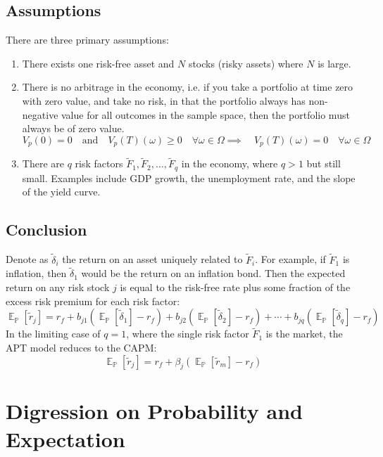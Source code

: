 \documentclass[11pt]{article}
\theoremstyle{definition}
\theoremstyle{remark}
\DeclareMathOperator{\Exp}{\mathbb{E}}
\DeclareMathOperator{\Prob}{\mathbb{P}}
\begin{document}
\subsection{Assumptions}
There are three primary assumptions:
\begin{enumerate}
\item There exists one risk-free asset and $N$ stocks (risky assets) where $N$ is large.
\item There is no arbitrage in the economy, i.e. if you take a portfolio at time zero with zero value, and take no risk, in that the portfolio always has non-negative value for all outcomes in the sample space, then the portfolio must always be of zero value.
$$V_p(0) = 0 \quad \text{and} \quad V_p(T)(\omega) \geq 0 \quad \forall \omega \in \Omega \implies \quad V_p(T)(\omega) = 0 \quad \forall \omega \in \Omega$$
\item There are $q$ risk factors $\tilde{F}_1, \tilde{F}_2, \dots, \tilde{F}_q$ in the economy, where $q > 1$ but still small. Examples include GDP growth, the unemployment rate, and the slope of the yield curve.
\end{enumerate}

\subsection{Conclusion}

Denote as $\tilde{\delta}_i$ the return on an asset uniquely related to $\tilde{F}_i$. For example, if $\tilde{F}_1$ is inflation, then $\tilde{\delta}_1$ would be the return on an inflation bond. Then the expected return on any risk stock $j$ is equal to the risk-free rate plus some fraction of the excess risk premium for each risk factor:
$$\Exp_{\Prob}\left[\tilde{r}_j\right] = r_f + b_{j1} \left( \Exp_{\Prob}\left[\tilde{\delta}_1\right] - r_f \right) + b_{j2} \left( \Exp_{\Prob}\left[\tilde{\delta}_2\right] - r_f \right) + \cdots + b_{jq} \left( \Exp_{\Prob}\left[\tilde{\delta}_q\right] - r_f \right)$$
In the limiting case of $q = 1$, where the single risk factor $\tilde{F}_1$ is the market, the APT model reduces to the CAPM:
$$\Exp_{\Prob}\left[\tilde{r}_j\right] = r_f + \beta_{j} \left( \Exp_{\Prob}\left[\tilde{r}_m\right] - r_f \right)$$

\section{Digression on Probability and Expectation}
\end{document}
